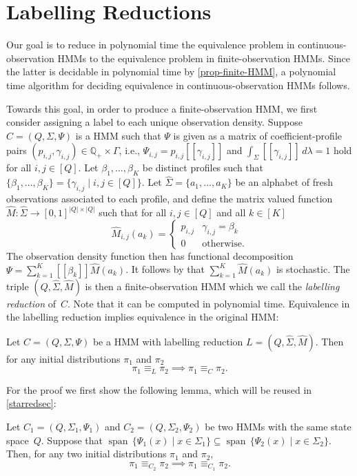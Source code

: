 \documentclass[a4paper,UKenglish,cleveref, autoref,mathscr]{lipics-v2019}
\newcommand{\QQ}{\mathbb{Q}}
\newcommand{\1}{\mathbbm{1}}
\DeclareMathOperator{\Span}{span\,}
\begin{document}
\section{Labelling Reductions}\label{finitelabred}
Our goal is to reduce in polynomial time the equivalence problem in continuous-observation HMMs to the equivalence problem in finite-observation HMMs.
Since the latter is decidable in polynomial time by \cref{prop-finite-HMM}, a polynomial time algorithm for deciding equivalence in continuous-observation HMMs follows.


Towards this goal, in order to produce a finite-observation HMM, we first consider assigning a label to each unique observation density.
Suppose $C = (Q, \Sigma, \Psi)$ is a HMM such that $\Psi$ is given as a matrix of coefficient-profile pairs $(p_{i,j}, \gamma_{i,j}) \in \QQ_+ \times \Gamma$, i.e., $\Psi_{i,j} = p_{i,j} [\![\gamma_{i,j}]\!]$ and $\int_{\Sigma} [\![\gamma_{i,j}]\!]\,d\lambda = 1$ hold for all $i,j \in [Q]$.
Let $\beta_1, \ldots, \beta_K$ be distinct profiles such that $\{\beta_1, \ldots, \beta_K\} = \{\gamma_{i,j} \mid i,j \in [Q]\}$.
Let $\hat{\Sigma} = \{a_1, \dots, a_K\}$ be an alphabet of fresh observations associated to each profile, and define the matrix valued function $\hat{M} : \hat{\Sigma} \rightarrow [0,1]^{|Q| \times |Q|}$ such that for all $i,j \in [Q]$ and all $k \in [K]$
\[
\hat{M}_{i,j}(a_k) = \begin{cases}
p_{i,j} & \gamma_{i,j} = \beta_k \\
0 & \text{otherwise}.
\end{cases}
\]
The observation density function then has functional decomposition $\Psi = \sum_{k = 1}^K [\![\beta_k]\!] \hat{M}(a_k)$. It follows by  that $\sum_{k = 1}^K \hat{M}(a_k)$ is stochastic.
The triple $(Q, \hat{\Sigma}, \hat{M})$ is then a finite-observation HMM which we call the \emph{labelling reduction} of~$C$.
Note that it can be computed in polynomial time.
Equivalence in the labelling reduction implies equivalence in the original HMM:
\begin{proposition}\label{redbydist}
Let $C = (Q, \Sigma, \Psi)$ be a HMM with labelling reduction $L = (Q, \hat{\Sigma}, \hat{M})$. Then for any initial distributions $\pi_1$ and $\pi_2$
$$\pi_1 \equiv_L \pi_2 \implies \pi_1 \equiv_C \pi_2.$$
\end{proposition}
For the proof we first show the following lemma, which will be reused in \cref{starredsec}:
\begin{lemma}\label{langequiv}
Let $C_1 = (Q, \Sigma_1, \Psi_1)$ and $C_2 = (Q, \Sigma_2, \Psi_2)$ be two HMMs with the same state space~$Q$.
Suppose that $\Span \{\Psi_1(x) \mid x \in \Sigma_1\} \subseteq \Span \{\Psi_2(x) \mid x \in \Sigma_2\}$.
Then, for any two initial distributions $\pi_1$ and $\pi_2$,
\[\pi_1 \equiv_{C_2} \pi_2 \implies \pi_1 \equiv_{C_1} \pi_2.\]
\end{lemma}
\end{document}
